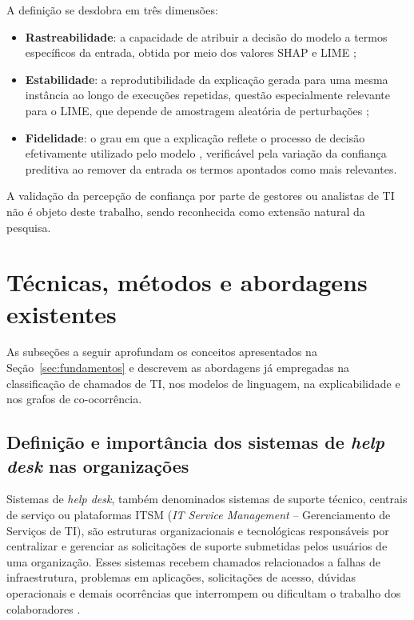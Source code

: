 \documentclass[
    12pt,                %
    openright,           %
    oneside,             %
    a4paper,             %
    english,             %
    brazil               %
]{abntex2}
\begin{document}
A definição se desdobra em três dimensões:

\begin{itemize}
    \item \textbf{Rastreabilidade}: a capacidade de atribuir a decisão
    do modelo a termos específicos da entrada, obtida por meio dos
    valores SHAP \cite{lundberg2017} e LIME \cite{ribeiro2016};

    \item \textbf{Estabilidade}: a reprodutibilidade da explicação
    gerada para uma mesma instância ao longo de execuções repetidas,
    questão especialmente relevante para o LIME, que depende de
    amostragem aleatória de perturbações \cite{salih2023};

    \item \textbf{Fidelidade}: o grau em que a explicação reflete o
    processo de decisão efetivamente utilizado pelo modelo
    \cite{jacovi2020}, verificável pela variação da confiança preditiva
    ao remover da entrada os termos apontados como mais relevantes.
\end{itemize}

A validação da percepção de confiança por parte de gestores ou analistas
de TI não é objeto deste trabalho, sendo reconhecida como extensão
natural da pesquisa.


\section{Técnicas, métodos e abordagens existentes}
\label{sec:tecnicas}

As subseções a seguir aprofundam os conceitos apresentados na Seção~\ref{sec:fundamentos} e descrevem as abordagens já empregadas na classificação de chamados de TI, nos modelos de linguagem, na explicabilidade e nos grafos de co-ocorrência.

\subsection{Definição e importância dos sistemas de \textit{help desk} nas organizações}
\label{subsec:helpdesk_definicao}

Sistemas de \textit{help desk}, também denominados sistemas de suporte técnico, centrais de serviço ou plataformas ITSM (\textit{IT Service Management} -- Gerenciamento de Serviços de TI), são estruturas organizacionais e tecnológicas responsáveis por centralizar e gerenciar as solicitações de suporte submetidas pelos usuários de uma organização. Esses sistemas recebem chamados relacionados a falhas de infraestrutura, problemas em aplicações, solicitações de acesso, dúvidas operacionais e demais ocorrências que interrompem ou dificultam o trabalho dos colaboradores \cite{zemp2021}.
\end{document}
